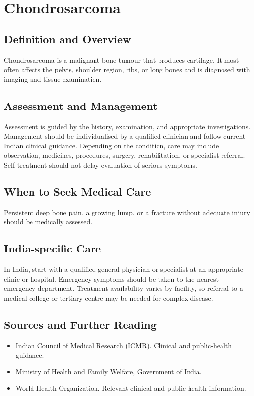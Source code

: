\chapter{Chondrosarcoma}

\section*{Definition and Overview}
Chondrosarcoma is a malignant bone tumour that produces cartilage. It most often affects the pelvis, shoulder region, ribs, or long bones and is diagnosed with imaging and tissue examination.

\section*{Assessment and Management}
Assessment is guided by the history, examination, and appropriate investigations. Management should be individualised by a qualified clinician and follow current Indian clinical guidance. Depending on the condition, care may include observation, medicines, procedures, surgery, rehabilitation, or specialist referral. Self-treatment should not delay evaluation of serious symptoms.

\section*{When to Seek Medical Care}
Persistent deep bone pain, a growing lump, or a fracture without adequate injury should be medically assessed.

\section*{India-specific Care}
In India, start with a qualified general physician or specialist at an appropriate clinic or hospital. Emergency symptoms should be taken to the nearest emergency department. Treatment availability varies by facility, so referral to a medical college or tertiary centre may be needed for complex disease.

\section*{Sources and Further Reading}
\begin{itemize}
    \item Indian Council of Medical Research (ICMR). Clinical and public-health guidance.
    \item Ministry of Health and Family Welfare, Government of India.
    \item World Health Organization. Relevant clinical and public-health information.
\end{itemize}

